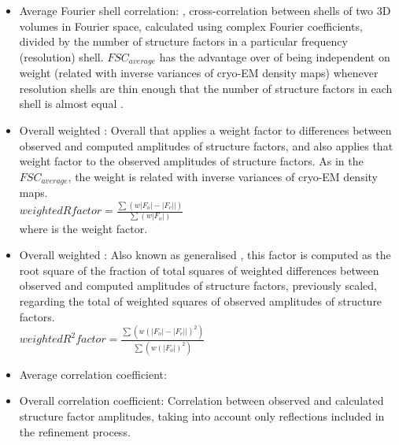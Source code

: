 \begin{itemize}
\begin{itemize}
\begin{itemize}
     \item Average Fourier shell correlation: , cross-correlation between shells of two 3D volumes in Fourier space, calculated using complex Fourier coefficients, divided by the number of structure factors in a particular frequency (resolution) shell. \begin{math}FSC_{average}\end{math} has the advantage over  of being independent on weight (related with inverse variances of cryo-EM density maps) whenever resolution shells are thin enough that the number of structure factors in each shell is almost equal \citep{brown2015}.
     
     \item Overall weighted : Overall  that applies a weight factor to differences between observed and computed amplitudes of structure factors, and also applies that weight factor to the observed amplitudes of structure factors. As in the \begin{math}FSC_{average}\end{math}, the weight is related with inverse variances of cryo-EM density maps.\\
     
     \begin{math}
           weighted R factor = \frac{\sum(w |F_o|-|F_c||)}{\sum(w |F_o|)}
     \end{math}\\
     
     where  is the weight factor.
     
     \item Overall weighted : Also known as generalised , this factor is computed as the root square of the fraction of total squares of weighted differences between observed and computed amplitudes of structure factors, previously scaled, regarding the total of weighted squares of observed amplitudes of structure factors.\\
     
     \begin{math}
           weighted R^2 factor = \frac{\sum(w (|F_o|-|F_c||)^2)}{\sum(w (|F_o|)^2)}
     \end{math}\\
     
     \item Average correlation coefficient:
     
     \item Overall correlation coefficient: Correlation between observed and calculated structure factor amplitudes, taking into account only reflections included in the refinement process.
     

\end{itemize}
\end{itemize}
\end{itemize}
